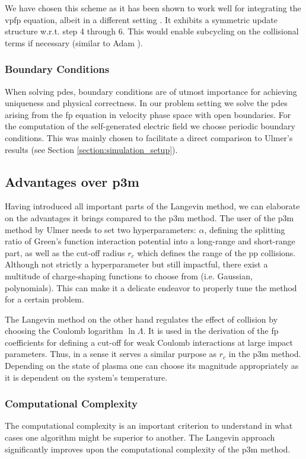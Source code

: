 We have chosen this scheme as it has been shown to work well for integrating the \gls{vpfp} equation,
albeit in a different setting \cite{stoel}.
It exhibits a symmetric update structure w.r.t. step 4 through 6. This would enable subcycling
on the collisional terms if necessary (similar to Adam \cite{subcyclingAdam1982}).

\subsubsection{Boundary Conditions}

When solving \gls{pde}s, boundary conditions are of utmost importance for achieving uniqueness and
physical correctness. In our problem setting we solve the \gls{pde}s arising from the \gls{fp} equation
in velocity phase space with open boundaries.
For the computation of the self-generated electric field we choose periodic boundary conditions.
This was mainly chosen to facilitate a direct comparison to Ulmer's results \cite{p3m_ulmer} (see
Section \ref{section:simulation_setup}).

\subsection{Advantages over \gls{p3m}}
Having introduced all important parts of the Langevin method, we can elaborate on the advantages 
it brings compared to the \gls{p3m} method.
The user of the \gls{p3m} method by Ulmer needs to set two hyperparameters: $\alpha$, defining
the splitting ratio of Green's function interaction potential into a long-range and short-range
part, as well as the cut-off radius $r_c$ which defines the range of the \gls{pp} collisions. Although not
strictly a hyperparameter but still impactful, there exist a multitude of charge-shaping functions
to choose from (i.e. Gaussian, polynomials).
This can make it a delicate endeavor to properly tune the method for a certain problem.

The Langevin method on the other hand regulates the effect of collision by choosing the Coulomb
logarithm $\ln \Lambda$.
It is used in the derivation of the \gls{fp} coefficients for defining a cut-off for weak
Coulomb interactions at large impact parameters. Thus, in a sense it serves a similar purpose as 
$r_c$ in the \gls{p3m} method.
Depending on the state of plasma one can choose its magnitude appropriately as it is
dependent on the system's temperature.

\subsubsection{Computational Complexity}
The computational complexity is an important criterion to understand in what cases one algorithm
might be superior to another.
The Langevin approach significantly improves upon the computational complexity of the
\gls{p3m} method.

